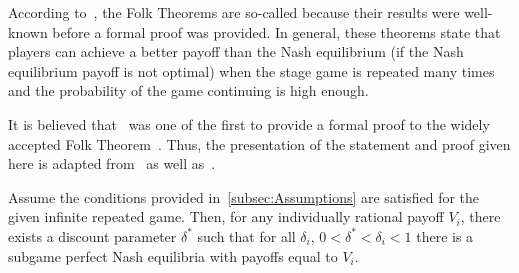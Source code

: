 According to~\cite{Webb2007}, the Folk Theorems are
so-called because their results were well-known before a formal proof was
provided. In general, these theorems state that players can achieve a better
payoff than the Nash equilibrium (if the Nash equilibrium payoff is not optimal)
when the stage game is repeated many times and the probability of the game
continuing is high enough. 

It is believed that~\cite{friedman1971non} was one of the
first to provide a formal proof to the widely accepted Folk
Theorem~\cite{Abreu1994, Webb2007}. Thus, the presentation of the statement and
proof given here is adapted from~\cite{friedman1971non} as well as~\cite{Knight2017b}.

\begin{theorem}
    Assume the conditions provided in~\autoref{subsec:Assumptions} are
    satisfied for the given infinite repeated game. Then, for any individually
    rational payoff \(V_{i}\), there exists a discount parameter \(\delta^{*}\)
    such that for all \(\delta_{i}\), \(0 < \delta^{*} < \delta_{i} < 1\) there
    is a subgame perfect Nash equilibria with payoffs equal to \(V_{i}\).
\end{theorem}\label{thm:Folk}

